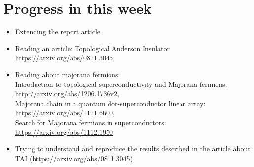 \documentclass[12pt]{article}
\numberwithin{equation}{section}
\begin{document}
\newpage
\section{Progress in this week}
\begin{itemize}
  \item Extending the report article
  \item Reading an article: Topological Anderson Insulator \url{https://arxiv.org/abs/0811.3045}
  \item Reading about majorana fermions: 
  \\ Introduction to topological superconductivity and Majorana fermions: \url{http://arxiv.org/abs/1206.1736v2}, 
  \\ Majorana chain in a quantum dot-superconductor linear array: \url{https://arxiv.org/abs/1111.6600},
  \\ Search for Majorana fermions in superconductors: \url{https://arxiv.org/abs/1112.1950}
  \item Trying to understand and reproduce the results described in the article about TAI (\url{https://arxiv.org/abs/0811.3045})
\end{itemize}
\end{document}
